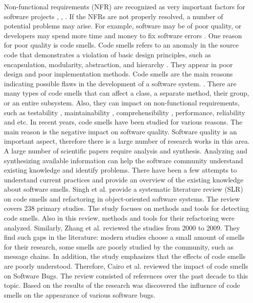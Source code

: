 \documentclass{sigchi}
\begin{document}
Non-functional requirements (NFR) are recognized as very important factors for software projects \cite{Chung}, \cite{Firesmith}, \cite{Ebert}. If the NFRs are not properly resolved, a number of potential problems may arise. For example, software may be of poor quality, or developers may spend more time and money to fix software errors \cite{Chung}. One reason for poor quality is code smells. Code smells refers to an anomaly in the source code that demonstrates a violation of basic design principles, such as encapsulation, modularity, abstraction, and hierarchy \cite{Booch}. They appear in poor design and poor implementation methods. Code smells are the main reasons indicating possible flaws in the development of a software system. \cite{Fowler}. There are many types of code smells that can affect a class, a separate method, their group, or an entire subsystem. Also, they can impact on non-functional requirements, such as testability \cite{Sabane}, maintainability \cite{Yamashita} \cite{Palomba}, comprehensibility \cite{Abbes}, performance, reliability \cite{Jaafar} and etc.
In recent years, code smells have been studied for various reasons. The main reason is the negative impact on software quality. Software quality is an important aspect, therefore there is a large number of research works in this area. A large number of scientific papers require analysis and synthesis. Analyzing and synthesizing available information can help the software community understand existing knowledge and identify problems.
There have been a few attempts to understand current practices and provide an overview of the existing knowledge about software smells. Singh et al. \cite{Singh} provide a systematic literature review (SLR) on code smells and refactoring in object-oriented software systems. The review covers 238 primary studies. The study focuses on methods and tools for detecting code smells. Also in this review, methods and tools for their refactoring were analyzed. 
Similarly, Zhang et al. \cite{Zhang} reviewed the studies from 2000 to 2009. They find such gaps in the literature: modern studies choose a small amount of smells for their research, some smells are poorly studied by the community, such as message chains. In addition, the study emphasizes that the effects of code smells are poorly understood.
Therefore, Cairo et al. \cite{Cairo} reviewed the impact of code smells on Software Bugs. The review consisted of references over the past decade to this topic. Based on the results of the research was discovered the influence of code smells on the appearance of various software bugs.
\end{document}
